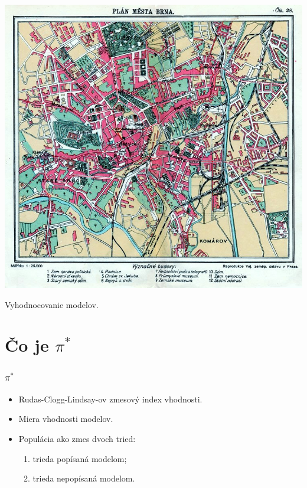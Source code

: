 \documentclass[14pt]{beamer}
\begin{document}
\begin{frame}
	\begin{center}
		\href{http://www.predseda.org/mapy/mapa-brno.jpg}{\includegraphics[scale=2]{mapa-brno.jpg}}
	\end{center}	
\end{frame}

\begin{frame}
	\begin{center}
		{\Large Vyhodnocovanie modelov.}
	\end{center}	
\end{frame}




\section{\v{C}o je $\pi^*$}

\begin{frame}
	\frametitle{$\pi^*$}
	\begin{itemize}
		\item[] Rudas-Clogg-Lindsay-ov zmesov\'y index vhodnosti.
		\item[] Miera vhodnosti modelov.
		\item[] Popul\'acia ako zmes dvoch tried:
		\begin{enumerate}
			\item 	trieda pop\'isan\'a modelom;
			\item	trieda nepop\'isan\'a modelom.
		\end{enumerate}
	\end{itemize}
\end{frame}
\end{document}
